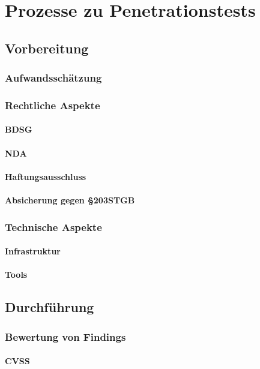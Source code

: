 \chapter{Prozesse zu Penetrationstests}
	\section{Vorbereitung}
		\subsection{Aufwandsschätzung}
		\subsection{Rechtliche Aspekte}
			\subsubsection{BDSG}
			\subsubsection{NDA}
			\subsubsection{Haftungsausschluss}
			\subsubsection{Absicherung gegen §203STGB}
		\subsection{Technische Aspekte}
			\subsubsection{Infrastruktur}
			\subsubsection{Tools}
	\section{Durchführung}
		\subsection{Bewertung von Findings}
			\subsubsection{CVSS}
